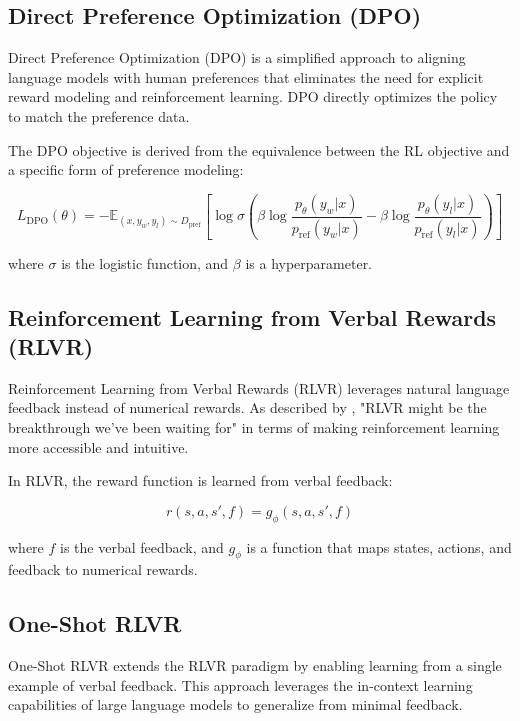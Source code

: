 \documentclass{article}
\begin{document}
\subsection{Direct Preference Optimization (DPO)}

Direct Preference Optimization (DPO) is a simplified approach to aligning language models with human preferences that eliminates the need for explicit reward modeling and reinforcement learning. DPO directly optimizes the policy to match the preference data.

The DPO objective is derived from the equivalence between the RL objective and a specific form of preference modeling:

\begin{equation}
L_{\text{DPO}}(\theta) = -\mathbb{E}_{(x, y_w, y_l) \sim D_{\text{pref}}}\left[\log \sigma\left(\beta \log\frac{p_{\theta}(y_w|x)}{p_{\text{ref}}(y_w|x)} - \beta \log\frac{p_{\theta}(y_l|x)}{p_{\text{ref}}(y_l|x)}\right)\right]
\end{equation}

where $\sigma$ is the logistic function, and $\beta$ is a hyperparameter.

\subsection{Reinforcement Learning from Verbal Rewards (RLVR)}

Reinforcement Learning from Verbal Rewards (RLVR) leverages natural language feedback instead of numerical rewards. As described by \cite{towardsdatascience2023}, "RLVR might be the breakthrough we've been waiting for" in terms of making reinforcement learning more accessible and intuitive.

In RLVR, the reward function is learned from verbal feedback:

\begin{equation}
r(s, a, s', f) = g_\phi(s, a, s', f)
\end{equation}

where $f$ is the verbal feedback, and $g_\phi$ is a function that maps states, actions, and feedback to numerical rewards.

\subsection{One-Shot RLVR}

One-Shot RLVR extends the RLVR paradigm by enabling learning from a single example of verbal feedback. This approach leverages the in-context learning capabilities of large language models to generalize from minimal feedback.
\end{document}
